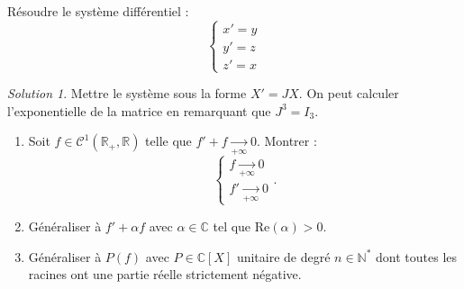 \documentclass[french]{book}
\newcommand{\N}{\mathbb{N}}
\newcommand{\R}{\mathbb{R}}
\newcommand{\C}{\mathbb{C}}
\newcommand{\st}{^*}
\theoremstyle{definition}
\theoremstyle{remark}
\newtheorem*{sol}{Solution}
\begin{document}
\begin{exo}[0]{}
	Résoudre le système différentiel :
	$$\begin{cases}
		x'=y\\
		y'=z\\
		z'=x
	\end{cases}$$
\end{exo}
\begin{sol}
	Mettre le système sous la forme $X'=JX$. On peut calculer l'exponentielle de la matrice en remarquant que $J^3=I_3$.
\end{sol}

\begin{exo}[1]{}
	\begin{enumerate}
		\item Soit $f\in\mathcal{C}^1(\R_+,\R)$ telle que $f'+f\xrightarrow[+\infty]{}0$. Montrer : $$\begin{cases}
			f\xrightarrow[+\infty]{}0 \\
			f'\xrightarrow[+\infty]{}0
		\end{cases}.$$
		\item Généraliser à $f'+\alpha f$ avec $\alpha\in\C$ tel que $\text{Re}(\alpha)>0$.
		\item Généraliser à $P(f)$ avec $P\in\C[X]$ unitaire de degré $n\in\N\st$ dont toutes les racines ont une partie réelle strictement négative.
	\end{enumerate}
\end{exo}
\end{document}
